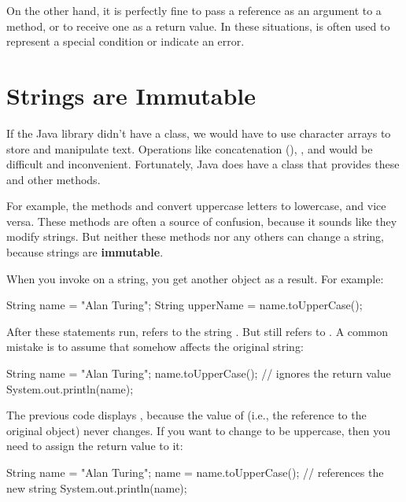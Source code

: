 On the other hand, it is perfectly fine to pass a  reference as an argument to a method, or to receive one as a return value.
In these situations,  is often used to represent a special condition or indicate an error.


\section{Strings are Immutable}

If the Java library didn't have a  class, we would have to use character arrays to store and manipulate text.
Operations like concatenation (\java{+}), , and  would be difficult and inconvenient.
Fortunately, Java does have a  class that provides these and other methods.


For example, the methods  and  convert uppercase letters to lowercase, and vice versa.
These methods are often a source of confusion, because it sounds like they modify strings.
But neither these methods nor any others can change a string, because strings are {\bf immutable}.

When you invoke  on a string, you get another  object as a result.
For example:

\begin{code}
String name = "Alan Turing";
String upperName = name.toUpperCase();
\end{code}


After these statements run,  refers to the string .
But  still refers to .
A common mistake is to assume that  somehow affects the original string:

\begin{code}
String name = "Alan Turing";
name.toUpperCase();           // ignores the return value
System.out.println(name);
\end{code}

The previous code displays , because the value of  (i.e., the reference to the original  object) never changes.
If you want to change  to be uppercase, then you need to assign the return value to it:

\begin{code}
String name = "Alan Turing";
name = name.toUpperCase();    // references the new string
System.out.println(name);
\end{code}

